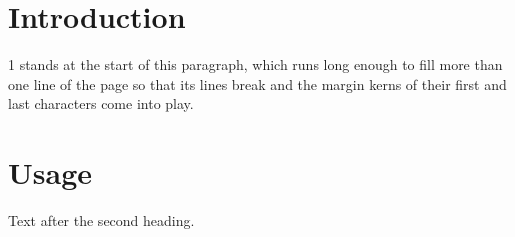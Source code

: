 \documentclass{article}
\begin{document}
\section{Introduction}
1 stands at the start of this paragraph, which runs long enough to fill
more than one line of the page so that its lines break and the margin
kerns of their first and last characters come into play.
\section{Usage}
Text after the second heading.
\end{document}
